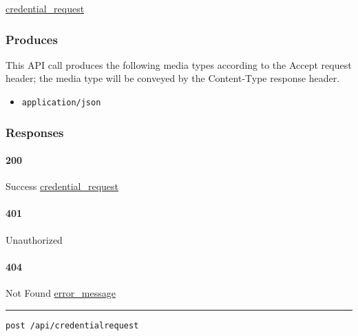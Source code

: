 \protect\hyperlink{credential_request}{credential\_request}

\hypertarget{produces-41}{%
\subsubsection{Produces}\label{produces-41}}

This API call produces the following media types according to the
{Accept} request header; the media type will be conveyed by the
{Content-Type} response header.

\begin{itemize}
\tightlist
\item
  \texttt{application/json}
\end{itemize}

\hypertarget{responses-41}{%
\subsubsection{Responses}\label{responses-41}}

\hypertarget{section-137}{%
\paragraph{200}\label{section-137}}

Success \protect\hyperlink{credential_request}{credential\_request}

\hypertarget{section-138}{%
\paragraph{401}\label{section-138}}

Unauthorized \protect\hyperlink{}{}

\hypertarget{section-139}{%
\paragraph{404}\label{section-139}}

Not Found \protect\hyperlink{error_message}{error\_message}

\begin{center}\rule{0.5\linewidth}{\linethickness}\end{center}

\protect\hypertarget{apiCredentialrequestPost}{}{}

\begin{verbatim}
post /api/credentialrequest
\end{verbatim}

